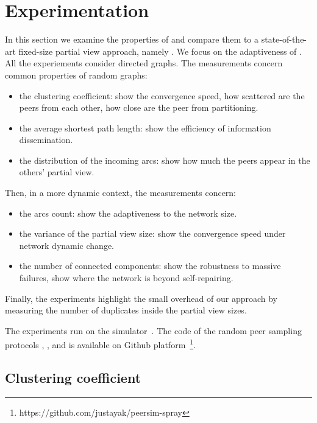 \section{Experimentation}
\label{sec:experiments}

In this section we examine the properties of \SPRAY and compare them to a
state-of-the-art fixed-size partial view approach, namely \CYCLON. We focus on
the adaptiveness of \SPRAY. All the experiements consider directed graphs. The
measurements concern common properties of random graphs:
\begin{itemize}
\item the clustering coefficient: show the convergence speed, how scattered
  are the peers from each other, how close are the peer from partitioning.
\item the average shortest path length: show the efficiency of information
  dissemination.
\item the distribution of the incoming arcs: show how much the peers appear
  in the others' partial view.
\end{itemize}
Then, in a more dynamic context, the measurements concern:
\begin{itemize}
\item the arcs count: show the adaptiveness to the network size.
\item the variance of the partial view size: show the convergence speed under
  network dynamic change.
\item the number of connected components: show the robustness to massive
  failures, show where the network is beyond self-repairing.
\end{itemize}
Finally, the experiments highlight the small overhead of our approach by
measuring the number of duplicates inside the partial view sizes.

The experiments run on the \PEERSIM
simulator~\cite{montresor2009peersim}. The code of the random peer sampling
protocols \CYCLON, \SCAMP, and \SPRAY is available on Github
platform~\footnote{https://github.com/justayak/peersim-spray}.

\subsection{Clustering coefficient}
\label{subsec:cluster}

